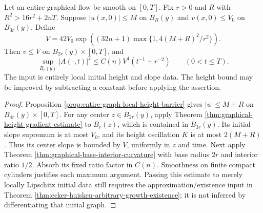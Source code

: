 \begin{proposition}\label{prop:graphical-initial-local-geometry-control}
Let an entire graphical flow be smooth on $[0,T]$. Fix $r>0$ and $R$ with $R^2>16r^2+2nT$. Suppose $|u(x,0)|\leq M$ on $B_R(y)$ and $v(x,0)\leq V_0$ on $B_{3r}(y)$. Define
\[
 V=42V_0\exp\left((32n+1)
          \max\{1,4(M+R)^2/r^2\}\right).
\]
Then $v\leq V$ on $B_{2r}(y)\times[0,T]$, and
\[
 \sup_{B_r(y)}|A(\cdot,t)|^2
       \leq C(n)V^4(t^{-1}+r^{-2})\qquad(0<t\leq T).
\]
The input is entirely local initial height and slope data. The height bound may be improved by subtracting a constant before applying the assertion.
\end{proposition}
\begin{proof}
Proposition \ref{prop:entire-graph-local-height-barrier} gives $|u|\leq M+R$ on $B_{4r}(y)\times[0,T]$. For any center $z\in B_{2r}(y)$, apply Theorem \ref{thm:graphical-height-gradient-estimate} to $B_r(z)$, which is contained in $B_{3r}(y)$. Its initial slope supremum is at most $V_0$, and its height oscillation $K$ is at most $2(M+R)$. Thus its center slope is bounded by $V$, uniformly in $z$ and time. Next apply Theorem \ref{thm:graphical-base-interior-curvature} with base radius $2r$ and interior ratio $1/2$. Absorb its fixed ratio factor in $C(n)$. Smoothness on finite compact cylinders justifies each maximum argument. Passing this estimate to merely locally Lipschitz initial data still requires the approximation/existence input in Theorem \ref{thm:ecker-huisken-arbitrary-growth-existence}; it is not inferred by differentiating that initial graph.
\end{proof}

